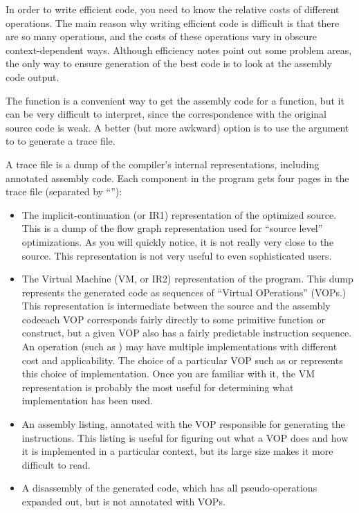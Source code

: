 In order to write efficient code, you need to know the relative costs
of different operations.  The main reason why writing efficient
\llisp{} code is difficult is that there are so many operations, and
the costs of these operations vary in obscure context-dependent ways.
Although efficiency notes point out some problem areas, the only way
to ensure generation of the best code is to look at the assembly code
output.

The  function is a convenient way to get the assembly code for a
function, but it can be very difficult to interpret, since the correspondence
with the original source code is weak.  A better (but more awkward) option is
to use the  argument to  to generate a trace
file.

A trace file is a dump of the compiler's internal representations,
including annotated assembly code.  Each component in the program gets
four pages in the trace file (separated by ``''):
\begin{itemize}
  
\item The implicit-continuation (or IR1) representation of the
  optimized source.  This is a dump of the flow graph representation
  used for ``source level'' optimizations.  As you will quickly
  notice, it is not really very close to the source.  This
  representation is not very useful to even sophisticated users.
  
\item The Virtual Machine (VM, or IR2) representation of the program.
  This dump represents the generated code as sequences of ``Virtual
  OPerations'' (VOPs.)  This representation is intermediate between
  the source and the assembly code\dash{}each VOP corresponds fairly
  directly to some primitive function or construct, but a given VOP
  also has a fairly predictable instruction sequence.  An operation
  (such as \code{+}) may have multiple implementations with different
  cost and applicability.  The choice of a particular VOP such as
   or  represents this choice of
  implementation.  Once you are familiar with it, the VM
  representation is probably the most useful for determining what
  implementation has been used.
  
\item An assembly listing, annotated with the VOP responsible for
  generating the instructions.  This listing is useful for figuring
  out what a VOP does and how it is implemented in a particular
  context, but its large size makes it more difficult to read.
  
\item A disassembly of the generated code, which has all
  pseudo-operations expanded out, but is not annotated with VOPs.
\end{itemize}


